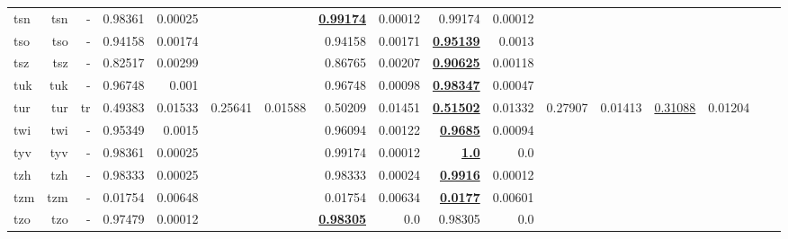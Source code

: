 \documentclass[11pt]{article}
\begin{document}
\begin{table*}[h]
{\begin{tabular}{lrrrrrrrrrrrrrrrr}
tsn         & tsn         & -         & 0.98361         & 0.00025         &          &          & \textbf{\underline{0.99174}}         & 0.00012         & 0.99174         & 0.00012         &          &          &          &          \\
tso         & tso         & -         & 0.94158         & 0.00174         &          &          & 0.94158         & 0.00171         & \textbf{\underline{0.95139}}         & 0.0013         &          &          &          &          \\
tsz         & tsz         & -         & 0.82517         & 0.00299         &          &          & 0.86765         & 0.00207         & \textbf{\underline{0.90625}}         & 0.00118         &          &          &          &          \\
tuk         & tuk         & -         & 0.96748         & 0.001         &          &          & 0.96748         & 0.00098         & \textbf{\underline{0.98347}}         & 0.00047         &          &          &          &          \\
tur         & tur         & tr         & 0.49383         & 0.01533         & 0.25641         & 0.01588         & 0.50209         & 0.01451         & \textbf{\underline{0.51502}}         & 0.01332         & 0.27907         & 0.01413         & \underline{0.31088}         & 0.01204         \\
twi         & twi         & -         & 0.95349         & 0.0015         &          &          & 0.96094         & 0.00122         & \textbf{\underline{0.9685}}         & 0.00094         &          &          &          &          \\
tyv         & tyv         & -         & 0.98361         & 0.00025         &          &          & 0.99174         & 0.00012         & \textbf{\underline{1.0}}         & 0.0         &          &          &          &          \\
tzh         & tzh         & -         & 0.98333         & 0.00025         &          &          & 0.98333         & 0.00024         & \textbf{\underline{0.9916}}         & 0.00012         &          &          &          &          \\
tzm         & tzm         & -         & 0.01754         & 0.00648         &          &          & 0.01754         & 0.00634         & \textbf{\underline{0.0177}}         & 0.00601         &          &          &          &          \\
tzo         & tzo         & -         & 0.97479         & 0.00012         &          &          & \textbf{\underline{0.98305}}         & 0.0         & 0.98305         & 0.0         &          &          &          &          \\

\end{tabular}}
\end{table*}
\end{document}
